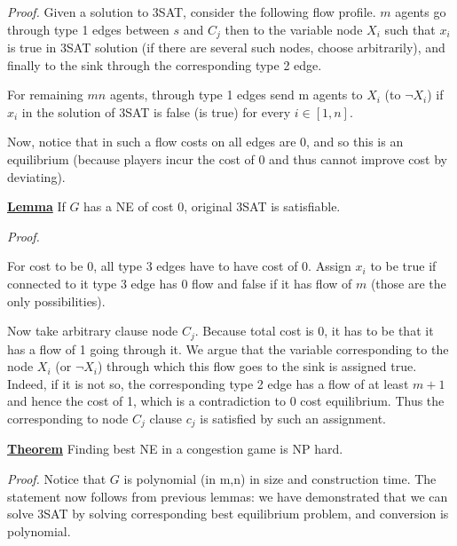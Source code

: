 \textit{Proof.} Given a solution to 3SAT, consider the following flow profile. $m$ agents go through type 1 edges between $s$ and $C_j$ then to the variable node $X_i$ such that $x_i$ is true in 3SAT solution (if there are several such nodes, choose arbitrarily), and finally to the sink through the corresponding type 2 edge. 

For remaining $mn$ agents, through type 1 edges send m agents to $X_i$ (to $\neg X_i$) if $x_i$ in the solution of 3SAT is false (is true) for every $i\in[1,n]$.

Now, notice that in such a flow costs on all edges are 0, and so this is an equilibrium (because players incur the cost of 0 and thus cannot improve cost by deviating).

\uline{\textbf{Lemma}} If  $G$ has a NE of cost 0, original 3SAT is satisfiable.

\textit{Proof.}

For cost to be 0, all type 3 edges have to have cost of 0. Assign $x_i$ to be true if connected to it type 3 edge has 0 flow and false if it has flow of $m$ (those are the only possibilities). 

Now take arbitrary clause node $C_j$. Because total cost is 0, it has to be that it has a flow of 1 going through it. We argue that the variable corresponding to the node $X_i$ (or $\neg X_i$) through which this flow goes to the sink is assigned true. Indeed, if it is not so, the corresponding type 2 edge has a flow of at least $m+1$ and hence the cost of 1, which is a contradiction to 0 cost equilibrium. Thus the corresponding to node $C_j$ clause $c_j$ is satisfied by such an assignment.

\uline{\textbf{Theorem}} Finding best NE in a congestion game is NP hard.

\textit{Proof.} Notice that $G$ is polynomial (in m,n) in size and construction time. The statement now follows from previous lemmas: we have demonstrated that we can solve 3SAT by solving corresponding best equilibrium problem, and conversion is polynomial.


